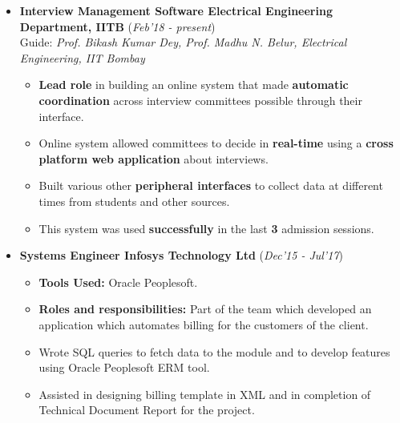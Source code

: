 \documentclass[10pt]{article}
\begin{document}
\hspace{-0.25cm}
\colorbox{bl}{}


\begin{itemize}
	\item \textbf{Interview Management Software \textpipe  \hspace{0.05cm} Electrical Engineering Department, IITB} \hfill{(\textit{Feb'18 - present})}\\
	Guide: \textit{Prof. Bikash Kumar Dey, Prof. Madhu N. Belur, Electrical Engineering, IIT Bombay}

\begin{itemize}

		\item \textbf{Lead role }in building an online system that made \textbf{automatic
coordination }across interview committees possible through their interface.
		\item Online system allowed committees to decide in \textbf{real-time} using a \textbf{cross platform web application} about interviews.
		\item Built various other \textbf{peripheral
interfaces} to collect data at different times from students and other sources.
		\item This system was used \textbf{successfully} in the last \textbf{3} admission sessions.
	\end{itemize}
\end{itemize}

\begin{itemize}[leftmargin=0.4cm]
	\item \textbf{Systems Engineer \textpipe  \hspace{0.05cm} Infosys Technology Ltd} \hfill{(\textit{Dec'15 - Jul'17})}
	
	\begin{itemize}
	    \item  \textbf{Tools Used:} Oracle Peoplesoft.
		\item \textbf{Roles and responsibilities:} Part of the team which developed an application which automates billing for the customers of the client.
		\item Wrote SQL queries to fetch data to the module and to develop features using Oracle Peoplesoft ERM tool.
		\item Assisted in designing billing template in XML and in completion of Technical Document Report for the project.
	
	\end{itemize}
\end{itemize}
\end{document}
